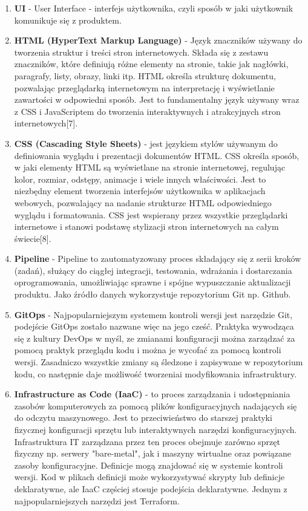 \begin{enumerate}
    \item {\bf UI} - User Interface - interfejs użytkownika, czyli sposób w jaki użytkownik komunikuje się z produktem.
   
    \item {\bf HTML (HyperText Markup Language)} - Język znaczników używany do tworzenia struktur i treści stron internetowych. Składa się z zestawu znaczników, które definiują różne elementy na stronie, takie jak nagłówki, paragrafy, listy, obrazy, linki itp. HTML określa strukturę dokumentu, pozwalając przeglądarką internetowym na interpretację i wyświetlanie zawartości w odpowiedni sposób. Jest to fundamentalny język używany wraz z CSS i JavaScriptem do tworzenia interaktywnych i atrakcyjnych stron internetowych[7].
    
    \item {\bf CSS (Cascading Style Sheets)} - jest językiem stylów używanym do definiowania wyglądu i prezentacji dokumentów HTML. CSS określa sposób, w jaki elementy HTML są wyświetlane na stronie internetowej, regulując kolor, rozmiar, odstępy, animacje i wiele innych właściwości. Jest to niezbędny element tworzenia interfejsów użytkownika w aplikacjach webowych, pozwalający na nadanie strukturze HTML odpowiedniego wyglądu i formatowania. CSS jest wspierany przez wszystkie przeglądarki internetowe i stanowi podstawę stylizacji stron internetowych na całym świecie[8].

    \item {\bf Pipeline} - Pipeline to zautomatyzowany proces składający się z serii kroków (zadań), służący do ciągłej integracji, testowania, wdrażania i dostarczania oprogramowania, umożliwiając sprawne i spójne wypuszczanie aktualizacji produktu. Jako źródło danych wykorzystuje repozytorium Git np. Github.

    \item {\bf GitOps} - Najpopularniejszym systemem kontroli wersji jest narzędzie Git, podejście GitOps zostało nazwane więc na jego cześć. Praktyka wywodząca się z kultury DevOps w myśl, ze zmianami konfiguracji można zarządzać za pomocą praktyk przeglądu kodu i można je wycofać za pomocą kontroli wersji. Zasadniczo wszystkie zmiany są śledzone i zapisywane w repozytorium kodu, co następnie daje możliwość tworzenia\linebreak i modyfikowania infrastruktury.

    \item {\bf Infrastructure as Code (IaaC)} - to proces zarządzania i udostępniania zasobów komputerowych za pomocą plików konfiguracyjnych nadających się do odczytu maszynowego. Jest to przeciwieństwo do starszej praktyki fizycznej konfiguracji sprzętu lub interaktywnych narzędzi konfiguracyjnych. Infrastruktura IT zarządzana przez ten proces obejmuje zarówno sprzęt fizyczny np. serwery "bare-metal", jak i maszyny wirtualne oraz powiązane zasoby konfiguracyjne. Definicje mogą znajdować się w systemie kontroli wersji. Kod w plikach definicji może wykorzystywać skrypty lub definicje deklaratywne, ale IaaC częściej stosuje podejścia deklaratywne. Jednym z najpopularniejszych narzędzi jest Terraform.
     
 \end{enumerate}